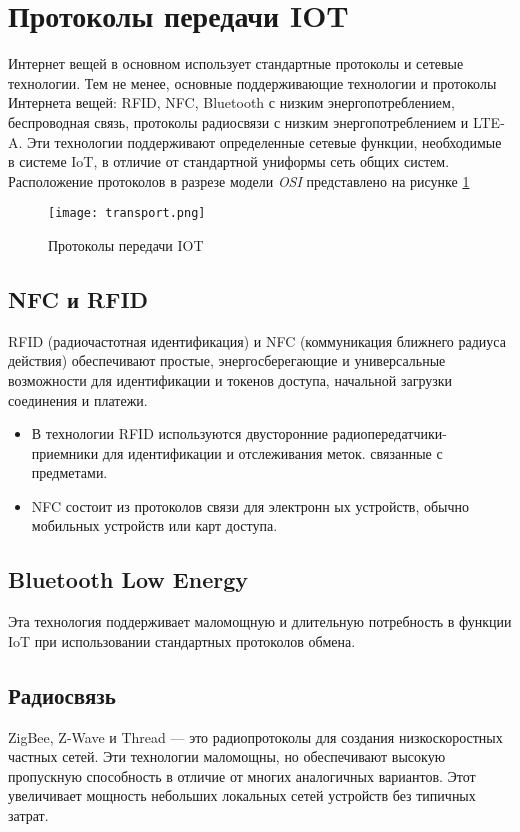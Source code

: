 \section{Протоколы передачи IOT}
Интернет вещей в основном использует стандартные протоколы и сетевые технологии. Тем не менее, основные
поддерживающие технологии и протоколы Интернета вещей: RFID, NFC, Bluetooth с низким энергопотреблением,
беспроводная связь, протоколы радиосвязи с низким энергопотреблением и LTE-A. Эти технологии поддерживают
определенные сетевые функции, необходимые в системе IoT, в отличие от стандартной униформы
сеть общих систем. Расположение протоколов в разрезе модели \textit{OSI} представлено на рисунке \ref{fig:section6:transport}

\begin{figure}[h!]
    \centering
    \texttt{[image: transport.png]}
    \caption{Протоколы передачи IOT}
    \label{fig:section6:transport}
\end{figure}

\subsection{NFC и RFID}
RFID (радиочастотная идентификация) и NFC (коммуникация ближнего радиуса действия) обеспечивают простые, энергосберегающие и универсальные возможности для идентификации и токенов доступа, начальной загрузки соединения и
платежи.
\begin{itemize}
    \item В технологии RFID используются двусторонние радиопередатчики-приемники для идентификации и отслеживания меток.
    связанные с предметами.
    \item NFC состоит из протоколов связи для электронн ых устройств, обычно мобильных устройств или карт доступа.
\end{itemize}


\subsection{Bluetooth Low Energy}
Эта технология поддерживает маломощную и длительную потребность в функции IoT при использовании стандартных протоколов обмена.

\subsection{Радиосвязь}
ZigBee, Z-Wave и Thread — это радиопротоколы для создания низкоскоростных частных сетей.
Эти технологии маломощны, но обеспечивают высокую пропускную способность в отличие от многих аналогичных вариантов. Этот
увеличивает мощность небольших локальных сетей устройств без типичных затрат.

